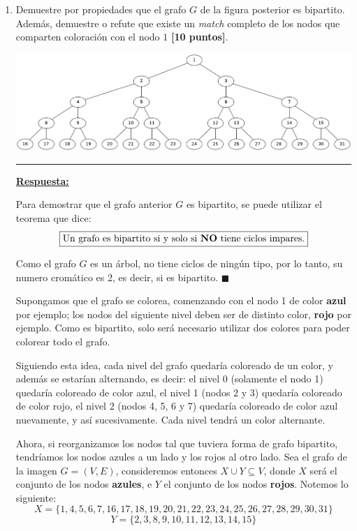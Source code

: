 \documentclass[legalpaper,10pt]{article}
\begin{document}
\begin{enumerate}[1)]
\item Demuestre por propiedades que el grafo \(G\) de la figura posterior es bipartito. Además, demuestre o refute que existe un \emph{match} completo de los nodos que comparten coloración con el nodo \(1\) \textbf{[10 puntos]}.
\begin{center}
\includegraphics[scale=0.25]{./figura1.png}
\end{center}

\rule{5cm}{0.4pt}

\underline{\textbf{Respuesta:}}

Para demostrar que el grafo anterior \(G\) es bipartito, se puede utilizar el teorema que dice:
\[\boxed{\text{Un grafo es bipartito si y solo si \textbf{NO} tiene ciclos impares.}}\]

Como el grafo \(G\) es un árbol, no tiene ciclos de ningún tipo, por lo tanto, su numero cromático es 2, es decir, si es bipartito. \hfill \(\blacksquare\)

\vspace{2em}

Supongamos que el grafo se colorea, comenzando con el nodo 1 de color \textbf{azul} por ejemplo; los nodos del siguiente nivel deben ser de distinto color, \textbf{rojo} por ejemplo. Como es bipartito, solo será necesario utilizar dos colores para poder colorear todo el grafo.

Siguiendo esta idea, cada nivel del grafo quedaría coloreado de un color, y además se estarían alternando, es decir: el nivel 0 (solamente el nodo 1) quedaría coloreado de color azul, el nivel 1 (nodos 2 y 3) quedaría coloreado de color rojo, el nivel 2 (nodos 4, 5, 6 y 7) quedaría coloreado de color azul nuevamente, y así sucesivamente. Cada nivel tendrá un color alternante.

Ahora, si reorganizamos los nodos tal que tuviera forma de grafo bipartito, tendríamos los nodos azules a un lado y los rojos al otro lado. Sea el grafo de la imagen \(G = (V,E)\), consideremos entonces \(X \cup Y \subseteq V\), donde \(X\) será el conjunto de los nodos \textbf{azules}, e \(Y\) el conjunto de los nodos \textbf{rojos}. Notemos lo siguiente:
\[X = \{1,4,5,6,7,16,17,18,19,20,21,22,23,24,25,26,27,28,29,30,31\}\]
\[Y = \{2,3,8,9,10,11,12,13,14,15\}\]


\end{enumerate}
\end{document}
